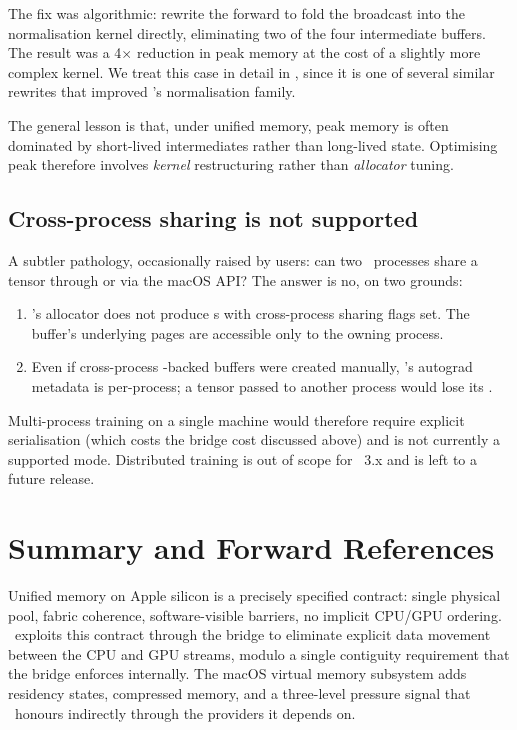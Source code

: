 The fix was algorithmic: rewrite the forward to fold the broadcast
into the normalisation kernel directly, eliminating two of the four
intermediate buffers. The result was a 4$\times$ reduction in peak
memory at the cost of a slightly more complex kernel. We treat this
case in detail in , since it is one of
several similar rewrites that improved \Lucid's normalisation family.

The general lesson is that, under unified memory, peak memory is
often dominated by short-lived intermediates rather than long-lived
state. Optimising peak therefore involves \emph{kernel} restructuring
rather than \emph{allocator} tuning.

\subsection{Cross-process sharing is not supported}
\label{ssec:unified_memory:no_cross_process}

A subtler pathology, occasionally raised by users: can two \Lucid\
processes share a tensor through 
or via the macOS \code{IOSurface} API? The answer is no, on two
grounds:

\begin{enumerate}
  \item \MLX's allocator does not produce s with
    cross-process sharing flags set. The buffer's underlying pages
    are accessible only to the owning process.
  \item Even if cross-process -backed buffers were
    created manually, \Lucid's autograd metadata is per-process; a
    tensor passed to another process would lose its \code{grad\_fn}.
\end{enumerate}

Multi-process training on a single machine would therefore require
explicit serialisation (which costs the bridge cost discussed above)
and is not currently a supported mode. Distributed training is out
of scope for \Lucid\ 3.x and is left to a future release.

\section{Summary and Forward References}
\label{sec:unified_memory:summary}

Unified memory on Apple silicon is a precisely specified contract:
single physical pool, fabric coherence, software-visible barriers,
no implicit CPU/GPU ordering. \Lucid\ exploits this contract through
the \code{SharedStorage} bridge to eliminate explicit data movement
between the CPU and GPU streams, modulo a single contiguity
requirement that the bridge enforces internally. The macOS virtual
memory subsystem adds residency states, compressed memory, and a
three-level pressure signal that \Lucid\ honours indirectly through
the providers it depends on.

